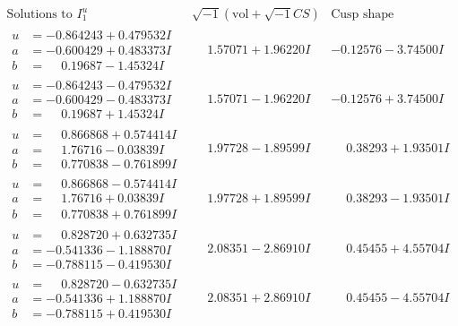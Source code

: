 \documentclass[1p]{elsarticle_modified}
\theoremstyle{definition}
\newcommand{\I}{\sqrt{-1}}
\begin{document}
$$\begin{array}{c|c|c}  
\text{Solutions to }I^u_{1}& \I (\text{vol} + \sqrt{-1}CS) & \text{Cusp shape}\\
 \hline 
\begin{aligned}
u &= -0.864243 + 0.479532 I \\
a &= -0.600429 + 0.483373 I \\
b &= \phantom{-}0.19687 - 1.45324 I\end{aligned}
 & \phantom{-}1.57071 + 1.96220 I & -0.12576 - 3.74500 I \\ \hline\begin{aligned}
u &= -0.864243 - 0.479532 I \\
a &= -0.600429 - 0.483373 I \\
b &= \phantom{-}0.19687 + 1.45324 I\end{aligned}
 & \phantom{-}1.57071 - 1.96220 I & -0.12576 + 3.74500 I \\ \hline\begin{aligned}
u &= \phantom{-}0.866868 + 0.574414 I \\
a &= \phantom{-}1.76716 - 0.03839 I \\
b &= \phantom{-}0.770838 - 0.761899 I\end{aligned}
 & \phantom{-}1.97728 - 1.89599 I & \phantom{-}0.38293 + 1.93501 I \\ \hline\begin{aligned}
u &= \phantom{-}0.866868 - 0.574414 I \\
a &= \phantom{-}1.76716 + 0.03839 I \\
b &= \phantom{-}0.770838 + 0.761899 I\end{aligned}
 & \phantom{-}1.97728 + 1.89599 I & \phantom{-}0.38293 - 1.93501 I \\ \hline\begin{aligned}
u &= \phantom{-}0.828720 + 0.632735 I \\
a &= -0.541336 - 1.188870 I \\
b &= -0.788115 - 0.419530 I\end{aligned}
 & \phantom{-}2.08351 - 2.86910 I & \phantom{-}0.45455 + 4.55704 I \\ \hline\begin{aligned}
u &= \phantom{-}0.828720 - 0.632735 I \\
a &= -0.541336 + 1.188870 I \\
b &= -0.788115 + 0.419530 I\end{aligned}
 & \phantom{-}2.08351 + 2.86910 I & \phantom{-}0.45455 - 4.55704 I \\ \hline\begin{aligned}

\end{aligned}
\end{array}$$
\end{document}
